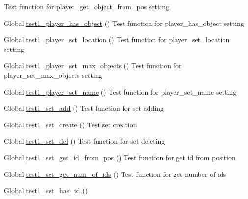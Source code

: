\begin{DoxyRefList}
Test function for player\+\_\+get\+\_\+object\+\_\+from\+\_\+pos setting  
\item[Global \mbox{\hyperlink{player__test_8c_abedc0e75ebffb4e7224f5e5ac0ee3055}{test1\+\_\+player\+\_\+has\+\_\+object}} ()]\label{test__test000152}%
%
Test function for player\+\_\+has\+\_\+object setting  
\item[Global \mbox{\hyperlink{player__test_8c_aec6799a4f46c3f3c471fcb668addcad4}{test1\+\_\+player\+\_\+set\+\_\+location}} ()]\label{test__test000142}%
%
Test function for player\+\_\+set\+\_\+location setting  
\item[Global \mbox{\hyperlink{player__test_8c_a5ea6b684fa6964067d029d5fee042874}{test1\+\_\+player\+\_\+set\+\_\+max\+\_\+objects}} ()]\label{test__test000156}%
%
Test function for player\+\_\+set\+\_\+max\+\_\+objects setting  
\item[Global \mbox{\hyperlink{player__test_8c_a9d87c09e6af910d695265e3fd77ae3a2}{test1\+\_\+player\+\_\+set\+\_\+name}} ()]\label{test__test000138}%
%
Test function for player\+\_\+set\+\_\+name setting  
\item[Global \mbox{\hyperlink{set__test_8c_a014ebe1b46af5ea318143fc61894d9c0}{test1\+\_\+set\+\_\+add}} ()]\label{test__test000169}%
%
Test function for set adding  
\item[Global \mbox{\hyperlink{set__test_8c_a6f654ab4b44e8a9b9cedfb78c378a5d7}{test1\+\_\+set\+\_\+create}} ()]\label{test__test000161}%
%
Test set creation  
\item[Global \mbox{\hyperlink{set__test_8c_a2a15d0c24e7a943dec28b6d8e3850e60}{test1\+\_\+set\+\_\+del}} ()]\label{test__test000171}%
%
Test function for set deleting  
\item[Global \mbox{\hyperlink{set__test_8c_a3e704a6d88b57445a8f0b7552a0b6636}{test1\+\_\+set\+\_\+get\+\_\+id\+\_\+from\+\_\+pos}} ()]\label{test__test000167}%
%
Test function for get id from position  
\item[Global \mbox{\hyperlink{set__test_8c_a5a1dfb479357ae68f69e6290b46158e3}{test1\+\_\+set\+\_\+get\+\_\+num\+\_\+of\+\_\+ids}} ()]\label{test__test000163}%
%
Test function for get number of ids  
\item[Global \mbox{\hyperlink{set__test_8c_affa806cab8e900cc297cc1a58f5ac35c}{test1\+\_\+set\+\_\+has\+\_\+id}} ()]\label{test__test000165}%

\end{DoxyRefList}
